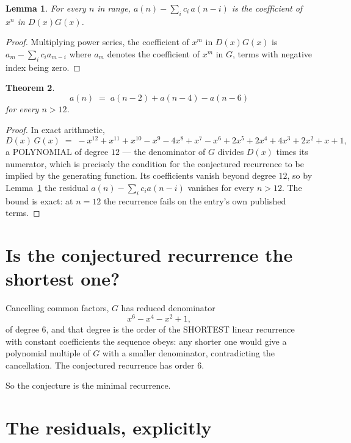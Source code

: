 \documentclass[11pt,a4paper]{article}
\theoremstyle{plain}
\newtheorem{theorem}{Theorem}
\newtheorem{lemma}[theorem]{Lemma}
\theoremstyle{definition}
\begin{document}
\begin{lemma}\label{lem:key}
For every $n$ in range, $a(n)-\sum_i c_i\,a(n-i)$ is the coefficient of $x^{n}$ in
$D(x)G(x)$.
\end{lemma}

\begin{proof}
Multiplying power series, the coefficient of $x^{m}$ in $D(x)G(x)$ is
$a_m-\sum_i c_i a_{m-i}$ where $a_m$ denotes the coefficient of $x^{m}$ in $G$, terms with
negative index being zero.
\end{proof}

\begin{theorem}
\[
a(n)\;=\;a(n-2) + a(n-4) - a(n-6)
\]
for every $n>12$.
\end{theorem}

\begin{proof}
In exact arithmetic,
\[
D(x)\,G(x)\;=\;- x^{12} + x^{11} + x^{10} - x^{9} - 4 x^{8} + x^{7} - x^{6} + 2 x^{5} + 2 x^{4} + 4 x^{3} + 2 x^{2} + x + 1,
\]
a POLYNOMIAL of degree $12$ --- the denominator of $G$ divides $D(x)$ times its numerator,
which is precisely the condition for the conjectured recurrence to be implied by the
generating function. Its coefficients vanish beyond degree $12$, so by
Lemma~\ref{lem:key} the residual $a(n)-\sum_ic_ia(n-i)$ vanishes for every
$n>12$. The bound is exact: at $n=12$ the recurrence fails on the entry's own published terms.
\end{proof}

\section{Is the conjectured recurrence the shortest one?}

Cancelling common factors, $G$ has reduced denominator
\[
x^{6} - x^{4} - x^{2} + 1,
\]
of degree $6$, and that degree is the order of the SHORTEST linear recurrence with
constant coefficients the sequence obeys: any shorter one would give a polynomial multiple of
$G$ with a smaller denominator, contradicting the cancellation. The conjectured recurrence has
order $6$.

So the conjecture is the minimal recurrence.

\section{The residuals, explicitly}
\end{document}
